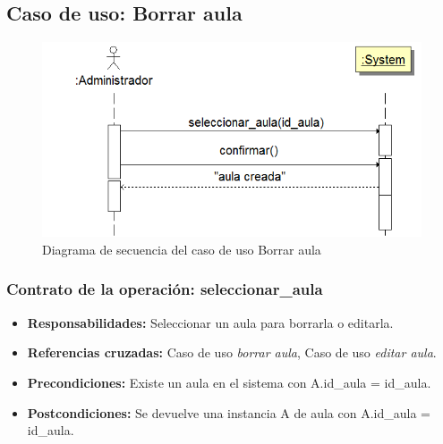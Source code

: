 \documentclass{book}
\begin{document}
\subsection{Caso de uso: Borrar aula}
\begin{figure}[H] 
  \label{comportamiento-borrar-aula} 
	\begin{center}
    \includegraphics[scale=0.5]{./secuencia-borrar-aula.png}
  \end{center}
\caption{Diagrama de secuencia del caso de uso Borrar aula}
\end{figure}

\subsubsection{Contrato de la operación: seleccionar\_aula}
\begin{itemize}
\item {\bf Responsabilidades:} Seleccionar un aula para borrarla o editarla.
\item {\bf Referencias cruzadas:} Caso de uso {\em borrar aula}, Caso de uso {\em editar aula}.
\item {\bf Precondiciones:} Existe un aula en el sistema con A.id\_aula = id\_aula.
\item {\bf Postcondiciones:} Se devuelve una instancia A de aula con A.id\_aula = id\_aula.
\end{itemize}
\end{document}
